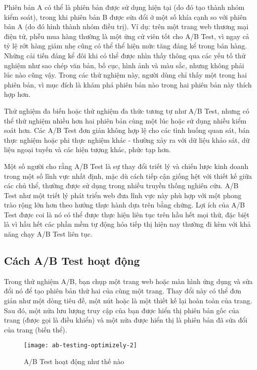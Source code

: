 Phiên bản A có thể là phiên bản được sử dụng hiện tại (do đó tạo thành nhóm kiểm soát), trong khi phiên bản B được sửa đổi ở một số khía cạnh so với phiên bản A (do đó hình thành nhóm điều trị). Ví dụ: trên một trang web thương mại điện tử, phễu mua hàng thường là một ứng cử viên tốt cho A/B Test, vì ngay cả tỷ lệ rớt hàng giảm nhẹ cũng có thể thể hiện mức tăng đáng kể trong bán hàng. Những cải tiến đáng kể đôi khi có thể được nhìn thấy thông qua các yếu tố thử nghiệm như sao chép văn bản, bố cục, hình ảnh và màu sắc, nhưng không phải lúc nào cũng vậy. Trong các thử nghiệm này, người dùng chỉ thấy một trong hai phiên bản, vì mục đích là khám phá phiên bản nào trong hai phiên bản này thích hợp hơn.

Thử nghiệm đa biến hoặc thử nghiệm đa thức tương tự như A/B Test, nhưng có thể thử nghiệm nhiều hơn hai phiên bản cùng một lúc hoặc sử dụng nhiều kiểm soát hơn. Các A/B Test đơn giản không hợp lệ cho các tình huống quan sát, bán thực nghiệm hoặc phi thực nghiệm khác - thường xảy ra với dữ liệu khảo sát, dữ liệu ngoại tuyến và các hiện tượng khác, phức tạp hơn.

Một số người cho rằng A/B Test là sự thay đổi triết lý và chiến lược kinh doanh trong một số lĩnh vực nhất định, mặc dù cách tiếp cận giống hệt với thiết kế giữa các chủ thể, thường được sử dụng trong nhiều truyền thống nghiên cứu. A/B Test như một triết lý phát triển web đưa lĩnh vực này phù hợp với một phong trào rộng lớn hơn theo hướng thực hành dựa trên bằng chứng. Lợi ích của A/B Test được coi là nó có thể được thực hiện liên tục trên hầu hết mọi thứ, đặc biệt là vì hầu hết các phần mềm tự động hóa tiếp thị hiện nay thường đi kèm với khả năng chạy A/B Test liên tục.

\subsection{Cách A/B Test hoạt động}

Trong thử nghiệm A/B, bạn chụp một trang web hoặc màn hình ứng dụng và sửa đổi nó để tạo phiên bản thứ hai của cùng một trang. Thay đổi này có thể đơn giản như một dòng tiêu đề, một nút hoặc là một thiết kế lại hoàn toàn của trang. Sau đó, một nửa lưu lượng truy cập của bạn được hiển thị phiên bản gốc của trang (được gọi là điều khiển) và một nửa được hiển thị là phiên bản đã sửa đổi của trang (biến thể).

\begin{figure}[ht]
	\centering
	\texttt{[image: ab-testing-optimizely-2]}
	\caption{A/B Test hoạt động như thế nào}
\end{figure}

